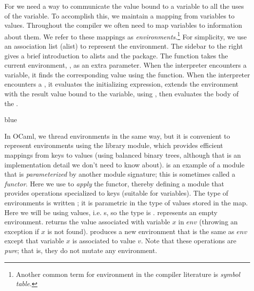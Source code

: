 \documentclass[11pt]{book}
\newenvironment{ocamlx}{
  \begin{color}{blue}
}
{
  \end{color}
}
\begin{document}
For  we need a way to communicate the value bound
to a variable to all the uses of the variable. To accomplish this, we
maintain a mapping from variables to values. Throughout the compiler
we often need to map variables to information about them. We refer to
these mappings as
\emph{environments}.\footnote{Another common term
  for environment in the compiler literature is \emph{symbol
    table}.}
%
For simplicity, we use an association list (alist) to represent the
environment. The sidebar to the right gives a brief introduction to
alists and the  package. The 
function takes the current environment, , as an extra
parameter.  When the interpreter encounters a variable, it finds the
corresponding value using the  function.  When the
interpreter encounters a , it evaluates the initializing
expression, extends the environment with the result value bound to the
variable, using , then evaluates the body of the
.

\begin{ocamlx}
  In OCaml, we thread environments in the same way, but
  it is convenient to represent environments using
  the  library module, which provides efficient
  mappings from keys to values (using balanced binary trees,
  although that is an implementation detail we don't need to
  know about).  is an example of a module that
  is \emph{parameterized} by another module signature; this
  is sometimes called a \emph{functor}.  Here we use 
  to \emph{apply} the functor, thereby defining a module  that provides operations
  specialized to  keys (suitable for variables).
  The type of environments is written ; it is
  parametric in the type  of values stored in the map.
  Here we will be using \LangVar{}
  values, i.e. s, so the type is .  
   represents an empty environment.
   returns the value associated with
  variable $x$ in $env$ (throwing an exception if $x$ is not found). 
   produces a new environment
  that is the same as $env$ except that variable $x$ is associated to
  value $v$. Note that these operations are \emph{pure}; that is, they
  do not mutate any environment.
\end{ocamlx}
\end{document}

